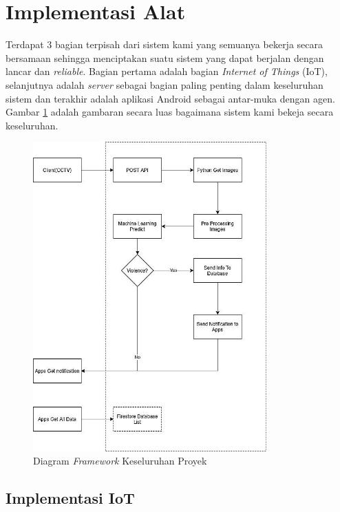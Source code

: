 \section{Implementasi Alat}

Terdapat 3 bagian terpisah dari sistem kami yang semuanya bekerja secara bersamaan sehingga menciptakan suatu sistem yang dapat berjalan dengan lancar dan \textit{reliable}. Bagian pertama adalah bagian \textit{Internet of Things} (IoT), selanjutnya adalah \textit{server} sebagai bagian paling penting dalam keseluruhan sistem dan terakhir adalah aplikasi Android sebagai antar-muka dengan agen. Gambar \ref{fig:framework} adalah gambaran secara luas bagaimana sistem kami bekeja secara keseluruhan.


\begin{figure} [!ht]
  \centering
  \includegraphics[width=0.8\textwidth]{gambar/framework.jpg}
  \caption{Diagram \textit{Framework} Keseluruhan Proyek}
  \label{fig:framework}
\end{figure}

\subsection{Implementasi IoT}

